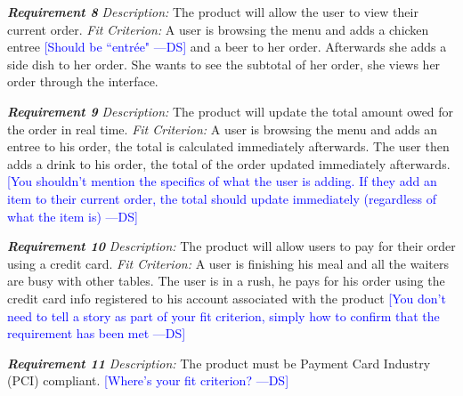 \documentclass[12pt, titlepage]{article}
\newcommand{\authornote}[3]{\textcolor{#1}{[#3 ---#2]}}
\newcommand{\authornote}[3]{}
\newcommand{\ds}[1]{\authornote{blue}{DS}{#1}}
\begin{document}
\noindent\textbf{\textit{Requirement 8}}\newline
\textit{Description:}\newline
The product will allow the user to view their current order. \newline\newline
\textit{Fit Criterion:}\newline 
A user is browsing the menu and adds a chicken entree \ds{Should be ``entr\'{e}e"}
 and a beer to her order. Afterwards she adds a side dish to her order. She wants to see the subtotal of her order, she views her order through the interface.
\newline

\noindent\textbf{\textit{Requirement 9}}\newline
\textit{Description:}\newline
The product will update the total amount owed for the order in real time. \newline\newline
\textit{Fit Criterion:}\newline 
A user is browsing the menu and adds an entree to his order, the total is calculated immediately afterwards. The user then adds a drink to his order, the total of the order updated immediately afterwards. 
\ds{You shouldn't mention the specifics of what the user is adding. If they add
an item to their current order, the total should update immediately (regardless
of what the item is)}
\newline



\noindent\textbf{\textit{Requirement 10}}\newline
\textit{Description:}\newline
The product will allow users to pay for their order using a credit card. \newline\newline
\textit{Fit Criterion:}\newline 
A user is finishing his meal and all the waiters are busy with other tables. The user is in a rush, he pays for his order using the credit card info registered to his account associated with the product
\ds{You don't need to tell a story as part of your fit criterion, simply how
to confirm that the requirement has been met}
\newline

\noindent\textbf{\textit{Requirement 11}}\newline
\textit{Description:}\newline
The product must be Payment Card Industry (PCI) compliant.
\ds{Where's your fit criterion?}
\newline
\end{document}
